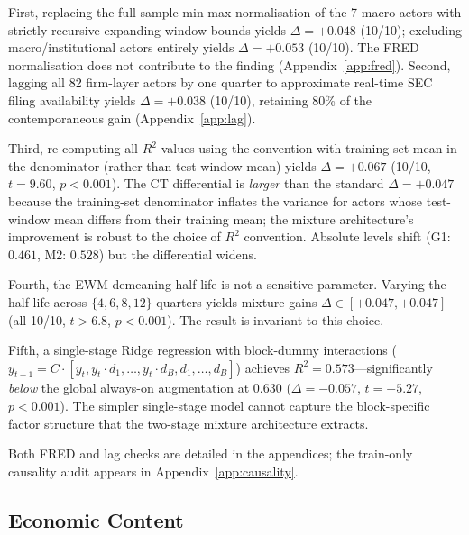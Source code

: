 \documentclass[11pt,a4paper]{article}
\begin{document}
First, replacing the full-sample min-max normalisation of the 7 macro actors with strictly recursive expanding-window bounds yields $\Delta = +0.048$ (10/10); excluding macro/institutional actors entirely yields $\Delta = +0.053$ (10/10). The FRED normalisation does not contribute to the finding (Appendix~\ref{app:fred}). Second, lagging all 82 firm-layer actors by one quarter to approximate real-time SEC filing availability yields $\Delta = +0.038$ (10/10), retaining 80\% of the contemporaneous gain (Appendix~\ref{app:lag}).

Third, re-computing all $R^2$ values using the \citet{stock2002forecasting} convention with training-set mean in the denominator (rather than test-window mean) yields $\Delta = +0.067$ (10/10, $t = 9.60$, $p < 0.001$). The CT differential is \emph{larger} than the standard $\Delta = +0.047$ because the training-set denominator inflates the variance for actors whose test-window mean differs from their training mean; the mixture architecture's improvement is robust to the choice of $R^2$ convention. Absolute levels shift (G1: $0.461$, M2: $0.528$) but the differential widens.

Fourth, the EWM demeaning half-life is not a sensitive parameter. Varying the half-life across $\{4, 6, 8, 12\}$ quarters yields mixture gains $\Delta \in [+0.047, +0.047]$ (all 10/10, $t > 6.8$, $p < 0.001$). The result is invariant to this choice.

Fifth, a single-stage Ridge regression with block-dummy interactions ($y_{t+1} = C \cdot [y_t, y_t \cdot d_1, \ldots, y_t \cdot d_B, d_1, \ldots, d_B]$) achieves $R^2 = 0.573$---significantly \emph{below} the global always-on augmentation at 0.630 ($\Delta = -0.057$, $t = -5.27$, $p < 0.001$). The simpler single-stage model cannot capture the block-specific factor structure that the two-stage mixture architecture extracts.

Both FRED and lag checks are detailed in the appendices; the train-only causality audit appears in Appendix~\ref{app:causality}.

\subsection{Economic Content}
\end{document}

